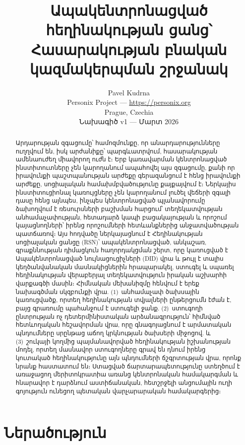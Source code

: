 \documentclass[11pt,a4paper,twocolumn]{article}
\title{\textbf{Ապակենտրոնացված հեղինակության ցանց՝\\Հասարակության բնական կազմակերպման շրջանակ}}
\author{Pavel Kudrna\\Personix Project --- \url{https://personix.org}\\Prague, Czechia\\Նախագիծ v1 --- Մարտ 2026}
\date{}
\begin{document}
\maketitle

\begin{abstract}
Արդարության զգացումը՝ համոզմունքը, որ անարդարությունները ուղղվում են, իսկ արժանիքը՝ պարգևատրվում, հասարակության ամենաուժեղ միավորող ուժն է։ Երբ կառավարման կենտրոնացված ինստիտուտները չեն կարողանում ապահովել այս զգացումը, քանի որ իրավունքի պաշտպանության արժեքը գերազանցում է հենց իրավունքի արժեքը, սոցիալական համախմբվածությունը քայքայվում է։ Ներկայիս ինստիտուցիոնալ կառույցները չեն կարողանում լուծել վեճերի զգալի դասը հենց այնպես, ինչպես կենտրոնացված պլանավորումը ձախողվում է ռեսուրսների բաշխման հարցում՝ տեղեկատվության անհամաչափության, հետադարձ կապի բացակայության և որոշում կայացնողների՝ իրենց որոշումների հետևանքներից անջատվածության պատճառով։ Այս հոդվածը ներկայացնում է Հեղինակության սոցիալական ցանցը (RSN)՝ ապակենտրոնացված, անկաշառ, գրաքննության դիմացկուն հաղորդակցման շերտ, որը կառուցված է Ապակենտրոնացված նույնացուցիչների (DID) վրա և թույլ է տալիս կեղծանվանական մասնակիցներին հրապարակել, ստուգել և սպառել հեղինակության վերաբերյալ տեղեկատվություն իրական աշխարհի վարքագծի մասին։ Հիմնական մեխանիզմը հենվում է երեք նախագծման սկզբունքի վրա. (1)~անհամաչափ ծախսային կառուցվածք, որտեղ հեղինակության տվյալների ընթերցումն էժան է, բայց գրառումը պահանջում է ստուգելի ջանք. (2)~ստուգողի ընտրության ոչ դետերմինիստական արձանագրություն՝ հիմնված հետևողական հեշավորման վրա, որը գնագոյացնում է արմատական պնդումները սրընթաց աճող կրկնության ծախսերի միջոցով. և (3)~շուկայի կողմից պայմանավորված հեղինակության իշխանության մոդել, որտեղ մասնավոր ստուգողները գրավ են դնում իրենց կուտակած հեղինակությունը այն պնդումների ճշգրտության վրա, որոնք նրանք հաստատում են։ Ստացված ճարտարապետությունը ստեղծում է առաջացող մերիտոկրատիա առանց կենտրոնական համակարգման և հնարավոր է դարձնում աստիճանական, հետշրջելի անցումային ուղի գոյություն ունեցող պետական վարչարարական համակարգերից։
\end{abstract}

\section{Ներածություն}
\end{document}
